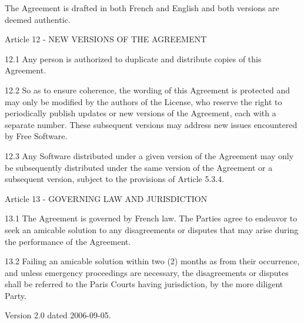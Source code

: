 \documentclass[oneside,english,onecolumn,letterpaper]{book}
\begin{document}
The Agreement is drafted in both French and English and both versions are deemed authentic.

Article 12 - NEW VERSIONS OF THE AGREEMENT

12.1 Any person is authorized to duplicate and distribute copies of this Agreement.

12.2 So as to ensure coherence, the wording of this Agreement is protected and may only be modified by the authors of the License, who reserve the right to periodically publish updates or new versions of the Agreement, each with a separate number. These subsequent versions may address new issues encountered by Free Software.

12.3 Any Software distributed under a given version of the Agreement may only be subsequently distributed under the same version of the Agreement or a subsequent version, subject to the provisions of Article 5.3.4.

Article 13 - GOVERNING LAW AND JURISDICTION

13.1 The Agreement is governed by French law. The Parties agree to endeavor to seek an amicable solution to any disagreements or disputes that may arise during the performance of the Agreement.

13.2 Failing an amicable solution within two (2) months as from their occurrence, and unless emergency proceedings are necessary, the disagreements or disputes shall be referred to the Paris Courts having jurisdiction, by the more diligent Party.

Version 2.0 dated 2006-09-05.
\end{document}
